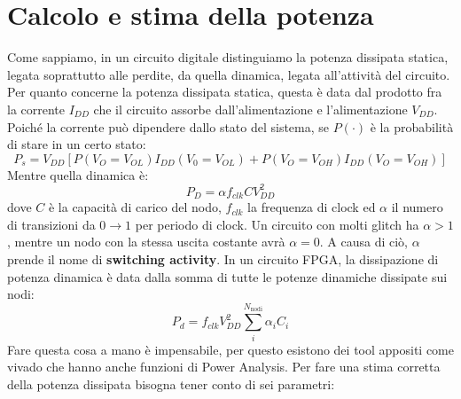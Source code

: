 \documentclass{book}
\begin{document}
    \section{Calcolo e stima della potenza}
        Come sappiamo, in un circuito digitale distinguiamo la potenza dissipata statica, legata 
        soprattutto alle perdite, da quella dinamica, legata all'attività del circuito. 
        \\ Per quanto concerne la potenza dissipata statica, questa è data dal prodotto fra
        la corrente $I_{DD}$ che il circuito assorbe dall'alimentazione e l'alimentazione $V_{DD}$.
        Poiché la corrente può dipendere dallo stato del sistema, se $P(\cdot)$ è la probabilità di stare 
        in un certo stato:
        \begin{equation}
            P_{s} = V_{DD}[P(V_{O}=V_{OL})I_{DD}(V_{0}=V_{OL})+P(V_{O}=V_{OH})I_{DD}(V_{O}=V_{OH})]
        \end{equation}
        Mentre quella dinamica è:
        \begin{equation}
            P_{D}= \alpha f_{clk}CV_{DD}^{2}
        \end{equation}
        dove $C$ è la capacità di carico del nodo, $f_{clk}$ la frequenza di clock ed 
        $\alpha$ il numero di transizioni da $0 \to 1$ per periodo di clock. Un circuito con molti glitch 
        ha $\alpha >1$, mentre un nodo con la stessa uscita costante avrà $\alpha = 0$. A causa di ciò,
        $\alpha$ prende il nome di \textbf{switching activity}. In un circuito FPGA, la dissipazione di potenza 
        dinamica è data dalla somma di tutte le potenze dinamiche dissipate sui nodi:
        \begin{equation}
            P_{d} = f_{clk}V_{DD} ^{2} \sum_{i} ^{N_{\textrm{nodi}}} \alpha_{i}C_{i} 
        \end{equation}
        Fare questa cosa a mano è impensabile, per questo esistono dei tool appositi come vivado che 
        hanno anche funzioni di Power Analysis. Per fare una stima corretta della potenza dissipata bisogna
        tener conto di sei parametri:
\end{document}
